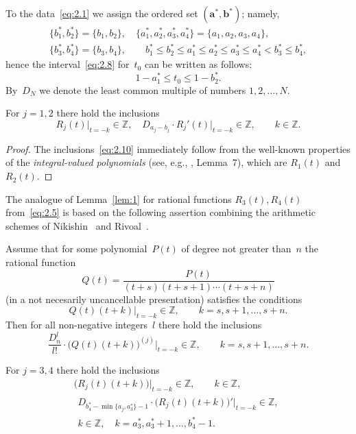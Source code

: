 \documentclass[a4paper,twoside]{article}
\numberwithin{equation}{section}
\renewcommand{\[}{\lfloor}
\renewcommand{\]}{\rfloor}
\newcommand{\<}{\langle}
\renewcommand{\>}{\rangle}
\newcommand{\rom}[1]{{\rm#1}}
\newcommand{\ba}{\boldsymbol a}
\newcommand{\bb}{\boldsymbol b}
\begin{document}
To the data~\eqref{eq:2.1} we assign the ordered set $(\ba^*,\bb^*)$; namely,
\begin{equation}
\begin{gathered}
\{b_1^*,b_2^*\}=\{b_1,b_2\},
\quad
\{a_1^*,a_2^*,a_3^*,a_4^*\}=\{a_1,a_2,a_3,a_4\},
\\
\{b_3^*,b_4^*\}=\{b_3,b_4\},
\qquad
b_1^*\le b_2^*
\le a_1^*\le a_2^*\le a_3^*\le a_4^*
<b_3^*\le b_4^*,
\end{gathered}
\label{eq:2.9}
\end{equation}
hence the interval~\eqref{eq:2.8} for~$t_0$ can be written as follows:
$$
1-a_1^*\le t_0\le 1-b_2^*.
$$
By~$D_N$ we denote the least common multiple of numbers $1,2,\dots,N$.

\begin{lemma}
\label{lem:1}
For $j=1,2$ there hold the inclusions
\begin{equation}
R_j(t)\big|_{t=-k}\in\mathbb Z,
\quad
D_{a_j-b_j}\cdot R_j'(t)\big|_{t=-k}\in\mathbb Z,
\qquad k\in\mathbb Z.
\label{eq:2.10}
\end{equation}
\end{lemma}

\begin{proof}
The inclusions~\eqref{eq:2.10} immediately follow from the well-known
properties of the {\it integral-valued polynomials\/}
(see, e.g., \cite{Zu5}, Lemma~7),
which are $R_1(t)$ and~$R_2(t)$.
\end{proof}

The analogue of Lemma~\ref{lem:1}
for rational functions $R_3(t),R_4(t)$ from~\eqref{eq:2.5}
is based on the following assertion
combining the arithmetic schemes of Ni\-ki\-shin~\cite{Ni}
and Rivoal~\cite{Ri1}.

\begin{lemma}
\label{lem:2}
Assume that for some polynomial~$P(t)$ of degree not greater than~$n$
the rational function
$$
Q(t)=\frac{P(t)}{(t+s)(t+s+1)\dotsb(t+s+n)}
$$
\rom(in a not necesarily uncancellable presentation\rom)
satisfies the conditions
$$
Q(t)(t+k)\big|_{t=-k}\in\mathbb Z,
\qquad k=s,s+1,\dots,s+n.
$$
Then for all non-negative integers~$l$ there hold the inclusions
$$
\frac{D_n^l}{l!}\cdot\bigl(Q(t)(t+k)\bigr)^{(j)}\big|_{t=-k}\in\mathbb Z,
\qquad k=s,s+1,\dots,s+n.
$$
\end{lemma}

\begin{lemma}
\label{lem:3}
For $j=3,4$ there hold the inclusions
\begin{gather}
\bigl(R_j(t)(t+k)\bigr)\big|_{t=-k}\in\mathbb Z,
\qquad k\in\mathbb Z,
\label{eq:2.11}
\\
\begin{gathered}
D_{b_4^*-\min\{a_j,a_3^*\}-1}
\cdot\bigl(R_j(t)(t+k)\bigr)'\big|_{t=-k}\in\mathbb Z,
\\
k\in\mathbb Z, \quad k=a_3^*,a_3^*+1,\dots,b_4^*-1.
\end{gathered}
\label{eq:2.12}
\end{gather}
\end{lemma}
\end{document}
